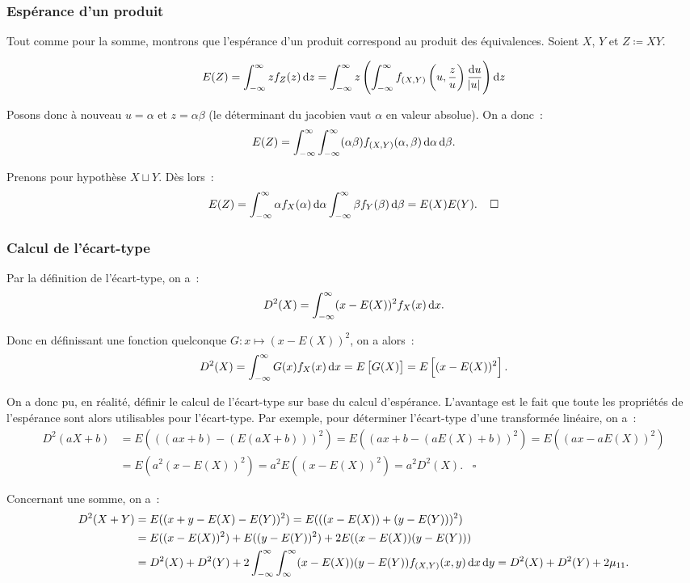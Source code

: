 \documentclass{article}
\begin{document}
		\subsubsection{Espérance d'un produit}
			Tout comme pour la somme, montrons que l'espérance d'un produit correspond au produit des équivalences. Soient $X$, $Y$ et $Z \coloneqq XY$.

			\[E(Z) = \int_{-\infty}^\infty zf_Z(z)\dif z
				= \int_{-\infty}^\infty z\left(\int_{-\infty}^\infty f_{(X, Y)}\left(u, \frac zu\right)\frac {\dif u}{\abs u}\right) \dif z\]

			Posons donc à nouveau $u = \alpha$ et $z = \alpha\beta$ (le déterminant du jacobien vaut $\alpha$ en valeur absolue). On a donc~:
			\[E(Z) = \int_{-\infty}^\infty\int_{-\infty}^\infty(\alpha\beta)f_{(X, Y)}(\alpha, \beta)\dif\alpha\dif\beta.\]

			Prenons pour hypothèse $X \sqcup Y$. Dès lors~:
			\[E(Z) = \int_{-\infty}^\infty\alpha f_X(\alpha)\dif\alpha\int_{-\infty}^\infty\beta f_Y(\beta)\dif\beta = E(X)E(Y).\;\;\;\;\square\]

		\subsubsection{Calcul de l'écart-type}
			Par la définition de l'écart-type, on a~:
			\[D^2(X) = \int_{-\infty}^\infty (x-E(X))^2f_X(x)\dif x.\]

			Donc en définissant une fonction quelconque $G : x \mapsto (x-E(X))^2$, on a alors~:
			\[D^2(X) = \int_{-\infty}^\infty G(x)f_X(x)\dif x = E\left[G(X)\right] = E\left[(x-E(X))^2\right].\]

			On a donc pu, en réalité, définir le calcul de l'écart-type sur base du calcul d'espérance. L'avantage est le fait que toute les propriétés de l'espérance
			sont alors utilisables pour l'écart-type. Par exemple, pour déterminer l'écart-type d'une transformée linéaire, on a~:
			\begin{align*}
				D^2(aX+b) &= E(((ax+b) - (E(aX+b)))^2) = E((ax+b-(aE(X)+b))^2) = E((ax-aE(X))^2) \\
						  &= E(a^2(x-E(X))^2) = a^2E((x-E(X))^2) = a^2D^2(X).\;\;\;\square
			\end{align*}

			Concernant une somme, on a~:
			\begin{align*}
				D^2(X+Y) &= E((x+y-E(X)-E(Y))^2) = E(((x-E(X)) + (y-E(Y)))^2) \\
						 &= E((x-E(X))^2) + E((y-E(Y))^2) + 2E((x-E(X))(y-E(Y))) \\
						 &= D^2(X) + D^2(Y) + 2\int_{-\infty}^\infty\int_{\-\infty}^\infty(x-E(X))(y-E(Y))f_{(X, Y)}(x, y)\dif x\dif y = D^2(X) + D^2(Y) + 2\mu_{11}.
			\end{align*}
\end{document}
